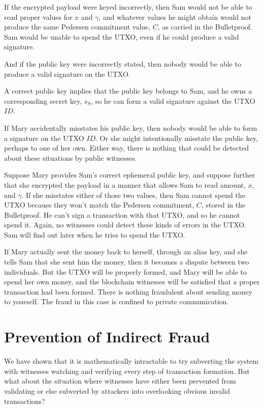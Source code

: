 \documentclass[a4paper, 10pt, conference]{ieeeconf}
\begin{document}
If the encrypted payload were keyed incorrectly, then Sam would not be able to read proper values for $x$ and $\gamma$, and whatever values he might obtain would not produce the same Pedersen commitment value, $C$, as carried in the Bulletproof. Sam would be unable to spend the UTXO, even if he could produce a valid signature.

And if the public key were incorrectly stated, then nobody would be able to produce a valid signature on the UTXO. 

A correct public key implies that the public key belongs to Sam, and he owns a corresponding secret key, $s_S$, so he can form a valid signature against the UTXO $\mathit{ID}$.

If Mary accidentally misstates his public key, then nobody would be able to form a signature on the UTXO $\mathit{ID}$. Or she might intentionally misstate the public key, perhaps to one of her own. Either way, there is nothing that could be detected about these situations by public witnesses. 

Suppose Mary provides Sam's correct ephemeral public key, and suppose further that she encrypted the payload in a manner that allows Sam to read amount, $x$, and $\gamma$. If she misstates either of those two values, then Sam cannot spend the UTXO because they won't match the Pedersen commitment, $C$, stored in the Bulletproof. He can't sign a transaction with that UTXO, and so he cannot spend it. Again, no witnesses could detect these kinds of errors in the UTXO. Sam will find out later when he tries to spend the UTXO.

If Mary actually sent the money back to herself, through an alias key, and she tells Sam that she sent him the money, then it becomes a dispute between two individuals. But the UTXO will be properly formed, and Mary will be able to spend her own money, and the blockchain witnesses will be satisfied that a proper transaction had been formed. There is nothing fraudulent about sending money to yourself. The fraud in this case is confined to private communication.

\section{Prevention of Indirect Fraud}
We have shown that it is mathematically intractable to try subverting the system with witnesses watching and verifying every step of transaction formation. But what about the situation where witnesses have either been prevented from validating or else subverted by attackers into overlooking obvious invalid transactions?
\end{document}
